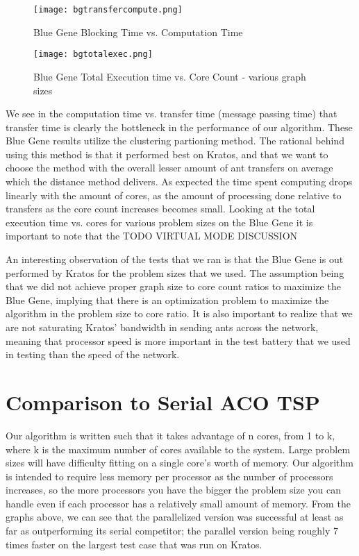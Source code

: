 \documentclass{acm_proc_article-sp}
\begin{document}
\begin{figure}[h!]
    \texttt{[image: bgtransfercompute.png]}
    \caption{Blue Gene Blocking Time vs. Computation Time}
\end{figure}

\begin{figure}[h!]
    \texttt{[image: bgtotalexec.png]}
    \caption{Blue Gene Total Execution time vs. Core Count - various graph sizes}
\end{figure}

We see in the computation time vs. transfer time (message passing time) that transfer time is clearly the bottleneck in the performance of our algorithm. These Blue Gene results utilize the clustering partioning method.
The rational behind using this method is that it performed best on Kratos, and that we want to choose the method with the overall lesser amount of ant transfers on average which the distance method delivers. As expected
the time spent computing drops linearly with the amount of cores, as the amount of processing done relative to transfers as the core count increases becomes small. Looking at the total execution time vs. cores for various
problem sizes on the Blue Gene it is important to note that the TODO VIRTUAL MODE DISCUSSION

An interesting observation of the tests that we ran is that the Blue Gene is out performed by Kratos for the problem sizes that we used. The assumption being that we did not achieve proper graph size to core count
ratios to maximize the Blue Gene, implying that there is an optimization problem to maximize the algorithm in the problem size to core ratio. It is also important to realize that we are not saturating Kratos' bandwidth
in sending ants across the network, meaning that processor speed is more important in the test battery that we used in testing than the speed of the network.

\section{Comparison to Serial ACO TSP}
Our algorithm is written such that it takes advantage of n cores, from 1 to k, where k is the maximum number of cores available to the system. Large problem sizes will have difficulty fitting on a single core's
worth of memory. Our algorithm is intended to require less memory per processor as the number of processors increases, so the more processors you have the bigger the problem size you can handle even if each processor
has a relatively small amount of memory. From the graphs above, we can see that the parallelized version was successful at least as far as outperforming its serial competitor; the parallel version being
roughly 7 times faster on the largest test case that was run on Kratos. 
\end{document}

